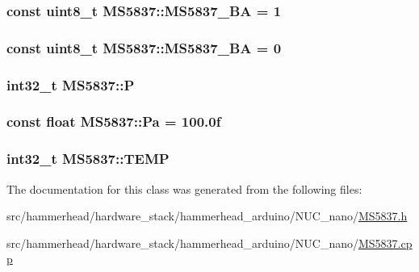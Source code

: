 \subsubsection[{\texorpdfstring{M\+S5837\+\_\+02\+BA}{MS5837_02BA}}]{\setlength{\rightskip}{0pt plus 5cm}const uint8\+\_\+t M\+S5837\+::\+M\+S5837\+\_\+BA = 1\hspace{0.3cm}{\ttfamily [static]}}\hypertarget{classMS5837_a5b94f94735c695d94882f689fc55e853}{}\label{classMS5837_a5b94f94735c695d94882f689fc55e853}
\subsubsection[{\texorpdfstring{M\+S5837\+\_\+30\+BA}{MS5837_30BA}}]{\setlength{\rightskip}{0pt plus 5cm}const uint8\+\_\+t M\+S5837\+::\+M\+S5837\+\_\+BA = 0\hspace{0.3cm}{\ttfamily [static]}}\hypertarget{classMS5837_abc4a4367230b5ee53fbaf8060231a4bb}{}\label{classMS5837_abc4a4367230b5ee53fbaf8060231a4bb}
\subsubsection[{\texorpdfstring{P}{P}}]{\setlength{\rightskip}{0pt plus 5cm}int32\+\_\+t M\+S5837\+::P\hspace{0.3cm}{\ttfamily [private]}}\hypertarget{classMS5837_a74fac4ed16bfe7a34e44a695e2801429}{}\label{classMS5837_a74fac4ed16bfe7a34e44a695e2801429}
\subsubsection[{\texorpdfstring{Pa}{Pa}}]{\setlength{\rightskip}{0pt plus 5cm}const float M\+S5837\+::\+Pa = 100.\+0f\hspace{0.3cm}{\ttfamily [static]}}\hypertarget{classMS5837_ae54d04a637682f68502e79d221bf00e3}{}\label{classMS5837_ae54d04a637682f68502e79d221bf00e3}
\subsubsection[{\texorpdfstring{T\+E\+MP}{TEMP}}]{\setlength{\rightskip}{0pt plus 5cm}int32\+\_\+t M\+S5837\+::\+T\+E\+MP\hspace{0.3cm}{\ttfamily [private]}}\hypertarget{classMS5837_a0b7861f997783664961579d4a70f1831}{}\label{classMS5837_a0b7861f997783664961579d4a70f1831}


The documentation for this class was generated from the following files\+:\begin{DoxyCompactItemize}
\item 
src/hammerhead/hardware\+\_\+stack/hammerhead\+\_\+arduino/\+N\+U\+C\+\_\+nano/\hyperlink{MS5837_8h}{M\+S5837.\+h}\item 
src/hammerhead/hardware\+\_\+stack/hammerhead\+\_\+arduino/\+N\+U\+C\+\_\+nano/\hyperlink{MS5837_8cpp}{M\+S5837.\+cpp}\end{DoxyCompactItemize}
